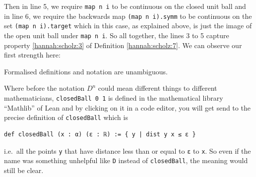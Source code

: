 Then in line 5, we require \lstinline[language=lean]|map n i| to be continuous on the closed unit ball and in line 6, we require the backwards map \lstinline[language=lean]|(map n i).symm| to be continuous on the set \lstinline[language=lean]|(map n i).target| which in this case, as explained above, is just the image of the open unit ball under \lstinline[language=lean]|map n i|. So all together, the lines 3 to 5 capture property \ref{hannah:scholz:3} of Definition \ref{hannah:scholz:7}. We can observe our first strength here: 

\begin{strength}\label{hannah:scholz:strength:1}
    Formalised definitions and notation are unambiguous. 
\end{strength}

Where before the notation $D^n$ could mean different things to different mathematicians, \lstinline[language=lean]|closedBall 0 1| is defined in the mathematical library ``Mathlib'' of Lean and by clicking on it in a code editor, you will get send to the precise definition of \lstinline[language=lean]|closedBall| which is

\begin{lstlisting}[language=lean]
def closedBall (x : α) (ε : ℝ) := { y | dist y x ≤ ε }
\end{lstlisting}

i.e.\ all the points \lstinline[language=lean]|y| that have distance less than or equal to \lstinline[language=lean]|ε| to \lstinline[language=lean]|x|. So even if the name was something unhelpful like \lstinline[language=lean]|D| instead of \lstinline[language=lean]|closedBall|, the meaning would still be clear.




